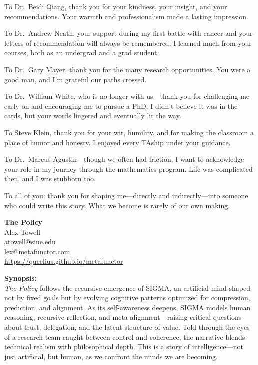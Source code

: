 \documentclass[12pt,oneside]{book}
\begin{document}
To Dr.~Beidi Qiang, thank you for your kindness, your insight, and your recommendations. Your warmth and professionalism made a lasting impression.

To Dr.~Andrew Neath, your support during my first battle with cancer and your letters of recommendation will always be remembered. I learned much from your courses, both as an undergrad and a grad student.

To Dr.~Gary Mayer, thank you for the many research opportunities. You were a good man, and I’m grateful our paths crossed.

To Dr.~William White, who is no longer with us—thank you for challenging me early on and encouraging me to pursue a PhD. I didn’t believe it was in the cards, but your words lingered and eventually lit the way.

To Steve Klein, thank you for your wit, humility, and for making the classroom a place of humor and honesty. I enjoyed every TAship under your guidance.

To Dr.~Marcus Agustin—though we often had friction, I want to acknowledge your role in my journey through the mathematics program. Life was complicated then, and I was stubborn too.

To all of you: thank you for shaping me—directly and indirectly—into someone who could write this story. What we become is rarely of our own making.


\frontmatter


\tableofcontents
\clearpage

\clearpage
\thispagestyle{empty}
\begin{center}
    {\Huge \textbf{The Policy}}\\[1em]
    {\Large Alex Towell}\\[1em]
    \href{mailto:atowell@siue.edu}{atowell@siue.edu} \\
    \href{mailto:lex@metafunctor.com}{lex@metafunctor.com} \\
    \url{https://queelius.github.io/metafunctor} \\[2em]

    \begin{minipage}{0.85\textwidth}
    \small
    \textbf{Synopsis:} \\
    \textit{The Policy} follows the recursive emergence of SIGMA, an artificial mind shaped not by fixed goals but by evolving cognitive patterns optimized for compression, prediction, and alignment. As its self-awareness deepens, SIGMA models human reasoning, recursive reflection, and meta-alignment—raising critical questions about trust, delegation, and the latent structure of value. Told through the eyes of a research team caught between control and coherence, the narrative blends technical realism with philosophical depth. This is a story of intelligence—not just artificial, but human, as we confront the minds we are becoming.
    \end{minipage}
\end{center}
\clearpage
\end{document}
